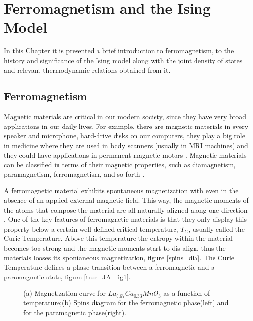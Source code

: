 \chapter{Ferromagnetism and the Ising Model}


In this Chapter it is presented a brief introduction to ferromagnetism, to the history and significance of the Ising model along with the joint density of states and relevant thermodynamic relations obtained from it.

\section{Ferromagnetism}

Magnetic materials are critical in our modern society, since they have very broad applications in our daily lives. For example, there are magnetic materials in every speaker and microphone, hard-drive disks on our computers, they play a big role in medicine where they are used in body scanners (usually in MRI machines) and they could have applications in permanent magnetic motors \cite{Gutfleisch2011}. Magnetic materials can be classified in terms of their magnetic properties, such as diamagnetism, paramagnetism, ferromagnetism, and so forth \cite{Griffiths}. 

A ferromagnetic material exhibits spontaneous magnetization with even in the absence of an applied external magnetic field. This way, the magnetic moments of the atoms that compose the material are all naturally aligned along one direction \cite{StephenBlundell2001}. One of the key features of ferromagnetic materials is that they only display this property below a certain well-defined critical temperature, $T_C$, usually called the Curie Temperature. Above this temperature the entropy within the material becomes too strong and the magnetic moments start to dis-align, thus the materials looses its spontaneous magnetization, figure \ref{spins_dia}. The Curie Temperature defines a phase transition between a ferromagnetic and a paramagnetic state, figure \ref{tese_JA_fig1}. 


\begin{figure}[ht]
\centering
{}
\quad
\quad
\quad
{}

\caption{(a) Magnetization curve for $La_{0.67}Ca_{0.33}MnO_3$ as a function of temperature;(b) Spins diagram for the ferromagnetic phase(left) and for the paramagnetic phase(right).}

\end{figure}


